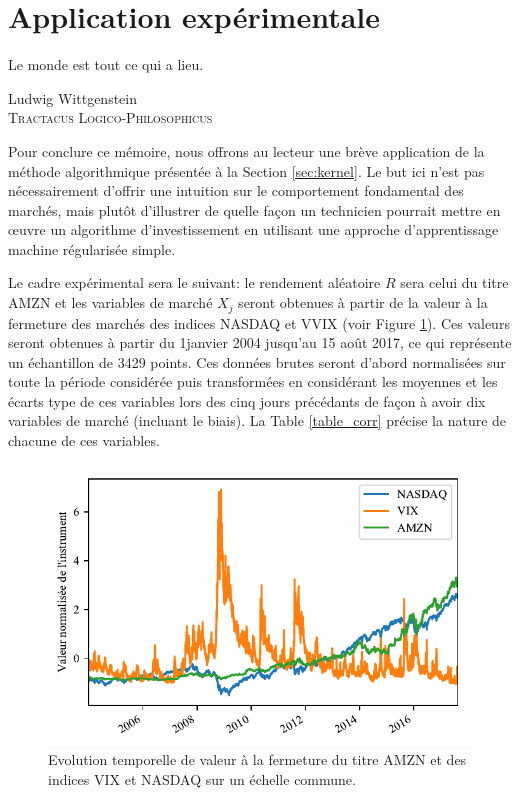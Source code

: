 \section{Application expérimentale}
\label{sec:app}

\epigraph{Le monde est tout ce qui a lieu.}{Ludwig Wittgenstein\\\textsc{Tractacus
    Logico-Philosophicus}}

Pour conclure ce mémoire, nous offrons au lecteur une brève application de la méthode
algorithmique présentée à la Section \ref{sec:kernel}. Le but ici n'est pas nécessairement
d'offrir une intuition sur le comportement fondamental des marchés, mais plutôt
d'illustrer de quelle façon un technicien pourrait mettre en œuvre un algorithme
d'investissement en utilisant une approche d'apprentissage machine régularisée simple.

Le cadre expérimental sera le suivant: le rendement aléatoire $R$ sera celui du titre AMZN
et les variables de marché $X_j$ seront obtenues à partir de la valeur à la fermeture des
marchés des indices NASDAQ et VVIX (voir Figure \ref{fig_corr1}). Ces valeurs seront
obtenues à partir du 1\ier janvier 2004 jusqu'au 15 août 2017, ce qui représente un
échantillon de 3429 points. Ces données brutes seront d'abord normalisées sur toute la
période considérée puis transformées en considérant les moyennes et les écarts type de ces
variables lors des cinq jours précédants de façon à avoir dix variables de marché
(incluant le biais). La Table \ref{table_corr} précise la nature de chacune de ces
variables.

\begin{figure}[h]
  \centering
  \includegraphics[width=\textwidth]{../experiments/fig/corr1.pdf}
  \caption[Evolution des variables de marché]{Evolution temporelle de valeur à la
    fermeture du titre AMZN et des indices VIX et NASDAQ sur un échelle commune.}
  \label{fig_corr1}
\end{figure}


